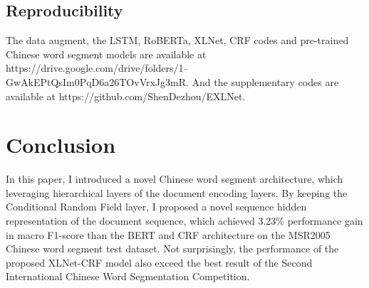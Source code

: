 \documentclass[11pt,a4paper]{article}
\begin{document}
\subsection{Reproducibility}

The data augment, the LSTM, RoBERTa, XLNet, CRF codes and pre-trained Chinese word segment models are available at https://drive.google.com/drive/folders/1--GwAkEPtQsIm0PqD6a26TOvVrxJg3mR.
And the supplementary codes are available at https://github.com/ShenDezhou/EXLNet.

\section{Conclusion}

In this paper, I introduced a novel Chinese word segment architecture, which leveraging hierarchical layers of the document encoding layers.
By keeping the Conditional Random Field layer, I proposed a novel sequence hidden representation of the document sequence, which achieved 3.23\% performance gain in macro F1-score than
the BERT and CRF architecture on the MSR2005 Chinese word segment test dataset.
Not surprisingly, the performance of the proposed XLNet-CRF model also exceed the best result of the Second International Chinese Word Segmentation Competition.





\end{document}
